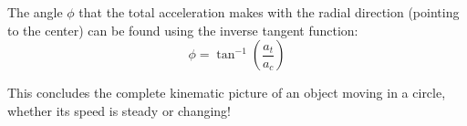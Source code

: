 \documentclass{article}
\begin{document}
The angle $\phi$ that the total acceleration makes with the radial direction (pointing to the center) can be found using the inverse tangent function:
\begin{equation}
    \phi = \tan^{-1}\left(\frac{a_t}{a_c}\right)
\end{equation}

This concludes the complete kinematic picture of an object moving in a circle, whether its speed is steady or changing!
\end{document}
